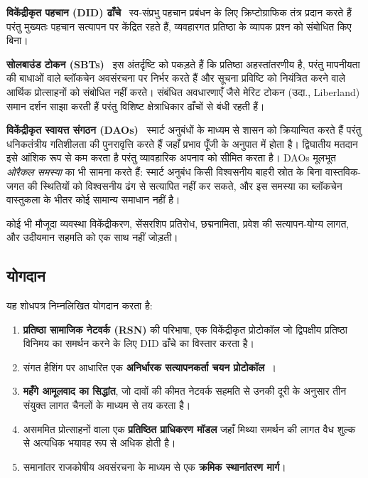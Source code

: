 \documentclass[11pt,a4paper,twocolumn]{article}
\begin{document}
\textbf{विकेंद्रीकृत पहचान (DID) ढाँचे}~\cite{did2022} स्व-संप्रभु पहचान प्रबंधन के लिए क्रिप्टोग्राफिक तंत्र प्रदान करते हैं परंतु मुख्यतः पहचान सत्यापन पर केंद्रित रहते हैं, व्यवहारगत प्रतिष्ठा के व्यापक प्रश्न को संबोधित किए बिना।

\textbf{सोलबाउंड टोकन (SBTs)}~\cite{weyl2022} इस अंतर्दृष्टि को पकड़ते हैं कि प्रतिष्ठा अहस्तांतरणीय है, परंतु मापनीयता की बाधाओं वाले ब्लॉकचेन अवसंरचना पर निर्भर करते हैं और सूचना प्रविष्टि को नियंत्रित करने वाले आर्थिक प्रोत्साहनों को संबोधित नहीं करते। संबंधित अवधारणाएँ जैसे मेरिट टोकन (उदा., Liberland) समान दर्शन साझा करती हैं परंतु विशिष्ट क्षेत्राधिकार ढाँचों से बंधी रहती हैं।

\textbf{विकेंद्रीकृत स्वायत्त संगठन (DAOs)}~\cite{buterin2014} स्मार्ट अनुबंधों के माध्यम से शासन को क्रियान्वित करते हैं परंतु धनिकतंत्रीय गतिशीलता की पुनरावृत्ति करते हैं जहाँ प्रभाव पूँजी के अनुपात में होता है। द्विघातीय मतदान~\cite{buterin2019} इसे आंशिक रूप से कम करता है परंतु व्यावहारिक अपनाव को सीमित करता है। DAOs मूलभूत \emph{ओरैकल समस्या} का भी सामना करते हैं: स्मार्ट अनुबंध किसी विश्वसनीय बाहरी स्रोत के बिना वास्तविक-जगत की स्थितियों को विश्वसनीय ढंग से सत्यापित नहीं कर सकते, और इस समस्या का ब्लॉकचेन वास्तुकला के भीतर कोई सामान्य समाधान नहीं है।

कोई भी मौजूदा व्यवस्था विकेंद्रीकरण, सेंसरशिप प्रतिरोध, छद्मनामिता, प्रवेश की सत्यापन-योग्य लागत, और उदीयमान सहमति को एक साथ नहीं जोड़ती।

\subsection{योगदान}

यह शोधपत्र निम्नलिखित योगदान करता है:
\begin{enumerate}[nosep]
\item \textbf{प्रतिष्ठा सामाजिक नेटवर्क (RSN)} की परिभाषा, एक विकेंद्रीकृत प्रोटोकॉल जो द्विपक्षीय प्रतिष्ठा विनिमय का समर्थन करने के लिए DID ढाँचे का विस्तार करता है।
\item संगत हैशिंग पर आधारित एक \textbf{अनिर्धारक सत्यापनकर्ता चयन प्रोटोकॉल}~\cite{karger1997}।
\item \textbf{महँगे आमूलवाद का सिद्धांत}, जो दावों की कीमत नेटवर्क सहमति से उनकी दूरी के अनुसार तीन संयुक्त लागत चैनलों के माध्यम से तय करता है।
\item असममित प्रोत्साहनों वाला एक \textbf{प्रतिष्ठित प्राधिकरण मॉडल} जहाँ मिथ्या समर्थन की लागत वैध शुल्क से अत्यधिक भयावह रूप से अधिक होती है।
\item समानांतर राजकोषीय अवसंरचना के माध्यम से एक \textbf{क्रमिक स्थानांतरण मार्ग}।
\end{enumerate}
\end{document}

